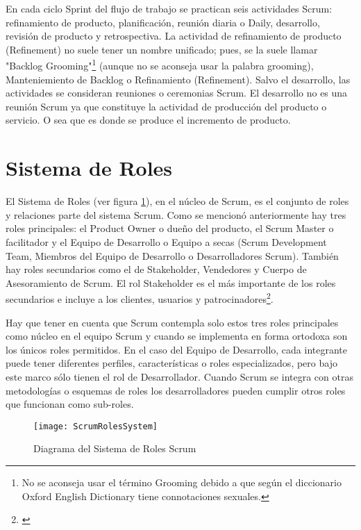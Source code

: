 En cada ciclo Sprint del flujo de trabajo se practican seis actividades Scrum: refinamiento de producto, planificación, reunión diaria o Daily, desarrollo, revisión de producto y retrospectiva. La actividad de refinamiento de producto (Refinement) no suele tener un nombre unificado; pues, se la suele llamar "Backlog Grooming"\footnote{No se aconseja usar el término Grooming debido a que según el diccionario Oxford English Dictionary tiene connotaciones sexuales.} (aunque no se aconseja usar la palabra grooming), Manteniemiento de Backlog o Refinamiento (Refinement). Salvo el desarrollo, las actividades se consideran reuniones o ceremonias Scrum. El desarrollo no es una reunión Scrum ya que constituye la actividad de producción del producto o servicio. O sea que es donde se produce el incremento de producto.

\section{Sistema de Roles}

El Sistema de Roles (ver figura \ref{fig:ScrumRolesSystem}), en el núcleo de Scrum, es el conjunto de roles y relaciones parte del sistema Scrum. Como se mencionó anteriormente hay tres roles principales: el Product Owner o dueño del producto, el Scrum Master o facilitador y el Equipo de Desarrollo o Equipo a secas (Scrum Development Team, Miembros del Equipo de Desarrollo o Desarrolladores Scrum). También hay roles secundarios como el de Stakeholder, Vendedores y Cuerpo de Asesoramiento de Scrum. El rol Stakeholder es el más importante de los roles secundarios e incluye a los clientes, usuarios y patrocinadores\footnote{\cite{SBOK-2013}}.

Hay que tener en cuenta que Scrum contempla solo estos tres roles principales como núcleo en el equipo Scrum y cuando se implementa en forma ortodoxa son los únicos roles permitidos. En el caso del Equipo de Desarrollo, cada integrante puede tener diferentes perfiles, características o roles especializados, pero bajo este marco sólo tienen el rol de Desarrollador. Cuando Scrum se integra con otras metodologías o esquemas de roles los desarrolladores pueden cumplir otros roles que funcionan como sub-roles.

\begin{figure}[h]
  \centering
  \texttt{[image: ScrumRolesSystem]}
  \caption{Diagrama del Sistema de Roles Scrum}
  \centering
  \label{fig:ScrumRolesSystem} %
\end{figure}


